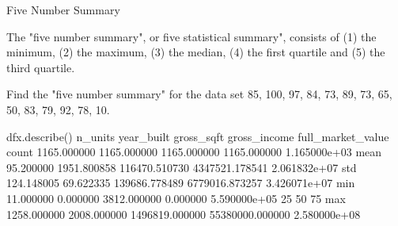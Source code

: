 
Five Number Summary

The "five number summary", or five statistical summary", consists of 
(1) the minimum, (2) the maximum, (3) the median, (4) the first quartile
and (5) the third quartile.

Find the "five number summary" for the data set
 {85, 100, 97, 84, 73, 89, 73, 65, 50, 83, 79, 92, 78, 10}.


dfx.describe()           n_units   year_built      gross_sqft     gross_income  full_market_value
count  
1165.000000  1165.000000     1165.000000      1165.000000       1.165000e+03
mean     
95.200000  1951.800858   116470.510730   4347521.178541       2.061832e+07
std     124.148005    69.622335   139686.778489   6779016.873257       3.426071e+07
min      11.000000     0.000000     3812.000000         0.000000       5.590000e+05
25%
50%
75%
max    1258.000000  2008.000000  1496819.000000  55380000.000000       2.580000e+08

